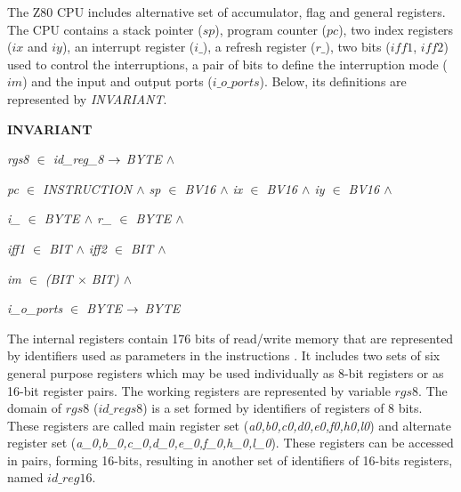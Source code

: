 \documentclass[a4paper]{llncs}
\begin{document}
The Z80 CPU includes alternative set of accumulator, flag and general registers. The CPU contains a stack
pointer ($\textit{sp}$), program counter ($\textit{pc}$), two index registers ($\textit{ix}$ and $\textit{iy}$), an
interrupt register ($\textit{i\_}$), a refresh register ($\textit{r\_}$), two bits ($\textit{iff1}$,
$\textit{iff2}$) used to control the interruptions, a pair of bits to define the interruption mode ($\textit{im}$)
and the input and output ports ($\textit{i\_o\_ports}$). Below, its definitions are represented by
\textit{INVARIANT}.
  
\begin{sloppypar}
\bf INVARIANT

\hspace*{0.10in}\it rgs8  $\in$  \it id\_reg\_8  $\rightarrow$  \it BYTE  $\land$ 

\hspace*{0.10in}\it pc  $\in$  \it INSTRUCTION  $\land$  \it sp  $\in$  \it BV16  $\land$  \it ix  $\in$  \it BV16  $\land$  \it iy  $\in$  \it BV16  $\land$ 

\hspace*{0.10in}\it i\_  $\in$  \it BYTE  $\land$  \it r\_ $\in$  \it BYTE  $\land$  

\hspace*{0.10in}\it iff1  $\in$  \it BIT  $\land$ \hspace*{0.10in}\it iff2  $\in$  \it BIT  $\land$ 

\hspace*{0.10in}\it im $\in$ (\it BIT $\times$ \it BIT\rm )  $\land$ 

\hspace*{0.10in}\it i\_o\_ports  $\in$  \it BYTE  $\rightarrow$  \it BYTE
\end{sloppypar}

% 

  The internal registers contain 176 bits of read/write memory that are represented by
identifiers used as parameters in the instructions . It includes two sets of six general purpose
registers which may be used individually as 8-bit registers or as 16-bit register pairs.  The working
registers are represented by variable $\textit{rgs8}$. The domain of $\textit{rgs8}$
($\textit{id\_regs8}$) is a set formed by identifiers of registers of 8 bits. These registers are called
main register set (\textit{a0,b0,c0,d0,e0,f0,h0,l0}) and alternate register set
(\textit{a\_0,b\_0,c\_0,d\_0,e\_0,f\_0,h\_0,l\_0}). These registers can be accessed in pairs, forming
16-bits, resulting in another set of identifiers of 16-bits registers, named $\textit{id\_reg16}$.
\end{document}
